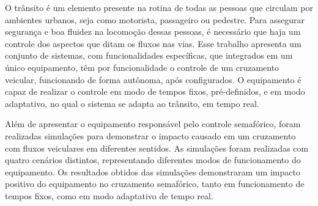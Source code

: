 O trânsito é um elemento presente na rotina de todas as pessoas que circulam por ambientes urbanos, seja como motorista, passageiro ou pedestre. Para assegurar segurança e boa fluidez na locomoção dessas pessoas, é necessário que haja um controle dos aspectos que ditam os fluxos nas vias.
Esse trabalho apresenta um conjunto de sistemas, com funcionalidades específicas, que integrados em um único equipamento, têm por funcionalidade o controle de um cruzamento veicular, funcionando de forma autônoma, após configurados. O equipamento é capaz de realizar o controle em modo de tempos fixos, pré-definidos, e em modo adaptativo, no qual o sistema se adapta ao trânsito, em tempo real.

Além de apresentar o equipamento responsável pelo controle semafórico, foram realizadas simulações para demonstrar o impacto causado em um cruzamento com fluxos veiculares em diferentes sentidos. As simulações foram realizadas com quatro cenários distintos, representando diferentes modos de funcionamento do equipamento.
Os resultados obtidos das simulações demonstraram um impacto positivo do equipamento no cruzamento semafórico, tanto em funcionamento de tempos fixos, como em modo adaptativo de tempo real.


